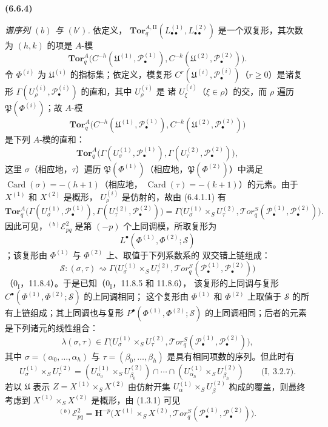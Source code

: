 \documentclass[UTF8,fontset=none,11pt,oneside,openany]{ctexbook}
\renewcommand{\leadsto}{\mathrel{\rightsquigarrow}}
\newenvironment{env}[1][]{%
  \par\medskip\noindent\textbf{(#1)}\ %
}{\par}
\newcommand{\oldpage}[2][]{%
  \hypertarget{ega-source-page-#1-#2}{}%
  \marginnote{\scriptsize\textbf{#1}~|~#2}\ignorespaces}
\begin{document}
\begin{env}[6.6.4]
\emph{谱序列 $(b)$ 与 $(b')$.} 依定义，
$\mathbf{Tor}_q^{A,\mathrm{II}}
(L_{\bullet\bullet}^{(1)},L_{\bullet\bullet}^{(2)})$ 是一个双复形，其次数为 $(h,k)$ 的项是
$A$-模
\[
  \mathbf{Tor}_q^A
  \bigl(C^{-h}(\mathfrak U^{(1)},\mathscr P_\bullet^{(1)}),
        C^{-k}(\mathfrak U^{(2)},\mathscr P_\bullet^{(2)})\bigr).
\]
令 $\Phi^{(i)}$ 为 $\mathfrak U^{(i)}$ 的指标集；依定义，模复形
$C^r(\mathfrak U^{(i)},\mathscr P_\bullet^{(i)})$（$r\geqslant0$）是诸复形
$\Gamma(U_\rho^{(i)},\mathscr P_\bullet^{(i)})$ 的直和，其中 $U_\rho^{(i)}$ 是
诸 $U_\xi^{(i)}$（$\xi\in\rho$）的交，而 $\rho$ 遍历
$\mathfrak P(\Phi^{(i)})$；故 $A$-模
\[
  \mathbf{Tor}_q^A
  \bigl(C^{-h}(\mathfrak U^{(1)},\mathscr P_\bullet^{(1)}),
        C^{-k}(\mathfrak U^{(2)},\mathscr P_\bullet^{(2)})\bigr)
\]
是下列 $A$-模的直和：
\[
  \mathbf{Tor}_q^A
  \bigl(\Gamma(U_\sigma^{(1)},\mathscr P_\bullet^{(1)}),
        \Gamma(U_\tau^{(2)},\mathscr P_\bullet^{(2)})\bigr),
\]
这里 $\sigma$（相应地，$\tau$）遍历
$\mathfrak P(\Phi^{(1)})$（相应地，$\mathfrak P(\Phi^{(2)})$）中满足
$\operatorname{Card}(\sigma)=-(h+1)$（相应地，
$\operatorname{Card}(\tau)=-(k+1)$）的元素。由于 $X^{(1)}$ 和 $X^{(2)}$ 是概形，
$U_\rho^{(i)}$ 是仿射的，故由 (6.4.1.1) 有
\[
  \mathbf{Tor}_q^A
  \bigl(\Gamma(U_\sigma^{(1)},\mathscr P_\bullet^{(1)}),
        \Gamma(U_\tau^{(2)},\mathscr P_\bullet^{(2)})\bigr)
  =\Gamma\bigl(U_\sigma^{(1)}\times_S U_\tau^{(2)},
    \mathscr{T}\!or_q^S
    (\mathscr P_\bullet^{(1)},\mathscr P_\bullet^{(2)})\bigr).
\]
\oldpage[III]{155}
因此可见，${}^{(b)}\mathscr E_{pq}^2$ 是第 $(-p)$ 个上同调模，所取复形为
\[
  L^\bullet(\Phi^{(1)},\Phi^{(2)};\mathscr S)
\]
；该复形由 $\Phi^{(1)}$ 与 $\Phi^{(2)}$ 上、取值于下列系数系的
双交错上链组成：
\[
  \mathscr S:(\sigma,\tau)\leadsto
  \Gamma\bigl(U_\sigma^{(1)}\times_S U_\tau^{(2)},
    \mathscr{T}\!or_q^S
    (\mathscr P_\bullet^{(1)},\mathscr P_\bullet^{(2)})\bigr)
\]
（$0_{\mathrm I}$，11.8.4）。于是已知（$0_{\mathrm I}$，11.8.5 和 11.8.6），
该复形的上同调与复形 $C^\bullet(\Phi^{(1)},\Phi^{(2)};\mathscr S)$ 的上同调相同；
这个复形由 $\Phi^{(1)}$ 和 $\Phi^{(2)}$ 上取值于 $\mathscr S$ 的所有上链组成；其上同调也与复形
$P^\bullet(\Phi^{(1)},\Phi^{(2)};\mathscr S)$ 的上同调相同；后者的元素是下列诸元的线性组合：
\[
  \lambda(\sigma,\tau)\in
  \Gamma\bigl(U_\sigma^{(1)}\times_S U_\tau^{(2)},
    \mathscr{T}\!or_q^S
    (\mathscr P_\bullet^{(1)},\mathscr P_\bullet^{(2)})\bigr),
\]
其中 $\sigma=(\alpha_0,\ldots,\alpha_h)$ 与
$\tau=(\beta_0,\ldots,\beta_h)$ 是具有相同项数的序列。但此时有
\[
  U_\sigma^{(1)}\times_S U_\tau^{(2)}
  =(U_{\alpha_0}^{(1)}\times_S U_{\beta_0}^{(2)})\cap\cdots\cap
    (U_{\alpha_h}^{(1)}\times_S U_{\beta_h}^{(2)})
  \qquad\text{(I, 3.2.7)}.
\]
若以 $\mathfrak U$ 表示 $Z=X^{(1)}\times_S X^{(2)}$ 由仿射开集
$U_\alpha^{(1)}\times_S U_\beta^{(2)}$ 构成的覆盖，则最终考虑到
$X^{(1)}\times_S X^{(2)}$ 是概形，由 (1.3.1) 可见
\[
  {}^{(b)}\mathscr E_{pq}^2
  =\mathbf H^{-p}\bigl(X^{(1)}\times_S X^{(2)},
    \mathscr{T}\!or_q^S
    (\mathscr P_\bullet^{(1)},\mathscr P_\bullet^{(2)})\bigr).
\]


\end{env}
\end{document}
